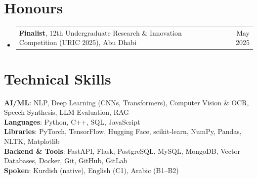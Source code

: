 \documentclass[letterpaper,11pt]{article}
\makeatletter
\newcommand{\resumeProjectHeading}[2]{
    \item
    \begin{tabular*}{0.97\textwidth}{l@{\extracolsep{\fill}}r}
      \small#1 & #2 \\
    \end{tabular*}\vspace{-7pt}
}
\newcommand{\resumeSubHeadingListStart}{\begin{itemize}[leftmargin=0.15in, label={}]}
\newcommand{\resumeSubHeadingListEnd}{\end{itemize}}
\makeatother
\begin{document}
\section{Honours}
  \resumeSubHeadingListStart
    \resumeProjectHeading
      {\textbf{Finalist}, 12th Undergraduate Research \& Innovation Competition (URIC 2025), Abu Dhabi}{May 2025}
  \resumeSubHeadingListEnd
  \vspace{-4pt}


\section{Technical Skills}
 \begin{itemize}[leftmargin=0.15in, label={}]
    \small{\item{
     \textbf{AI/ML}{: NLP, Deep Learning (CNNs, Transformers), Computer Vision \& OCR, Speech Synthesis, LLM Evaluation, RAG} \\
     \textbf{Languages}{: Python, C++, SQL, JavaScript} \\
     \textbf{Libraries}{: PyTorch, TensorFlow, Hugging Face, scikit-learn, NumPy, Pandas, NLTK, Matplotlib} \\
     \textbf{Backend \& Tools}{: FastAPI, Flask, PostgreSQL, MySQL, MongoDB, Vector Databases, Docker, Git, GitHub, GitLab} \\
     \textbf{Spoken}{: Kurdish (native), English (C1), Arabic (B1--B2)}
    }}
 \end{itemize}


\end{document}
